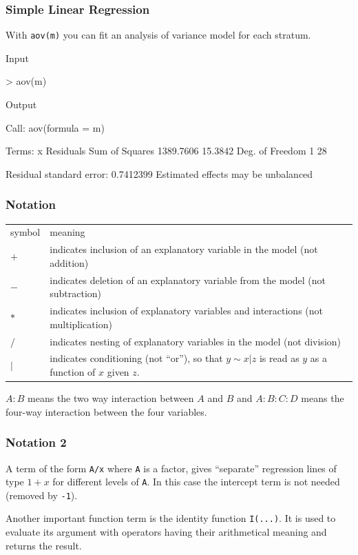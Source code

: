 \documentclass[xcolor={table},handout]{beamer}
\begin{document}
\begin{frame}[shrink=3,fragile]\frametitle{Simple Linear Regression}
With \texttt{aov(m)} you can fit an analysis of variance model for each stratum.
\begin{exampleblock}{Input}
\begin{semiverbatim}
> aov(m)
\end{semiverbatim}
\end{exampleblock}
\begin{exampleblock}{Output}\footnotesize
\begin{semiverbatim}
Call:
   aov(formula = m)

Terms:
                        x Residuals
Sum of Squares  1389.7606   15.3842
Deg. of Freedom         1        28

Residual standard error: 0.7412399 
Estimated effects may be unbalanced
\end{semiverbatim}
\end{exampleblock}
\end{frame}

\begin{frame}\frametitle{Notation}
\begin{center}
  \begin{tabular}{@{} >{\ttfamily}l p{9cm}} 
    \rowcolor{gray!40}
symbol & meaning\\
$+$ & indicates inclusion of an explanatory variable in the model (not addition)\\
$-$ & indicates deletion of an explanatory variable from the model (not subtraction)\\
$*$ & indicates inclusion of explanatory variables and interactions (not multiplication)\\
$/$ & indicates nesting of explanatory variables in the model (not division)\\
$|$ & indicates conditioning (not ``or''), so that $y \sim x | z $ is read as $y$ as a function of $x$ given $z$.\\
\end{tabular}
\end{center}
$A:B$ means the two way interaction between $A$ and $B$ and $A:B:C:D$ means the four-way interaction between the four variables.
\end{frame}

\begin{frame}\frametitle{Notation 2}
A term of the form \texttt{A/x} where \texttt{A} is a factor, gives ``separate'' regression lines of type $1+x$ for different levels of \texttt{A}. In this case the intercept term is not needed (removed by \texttt{-1}).

Another important function term is the identity function \texttt{I(...)}. It is used to evaluate its argument with operators having their arithmetical meaning and returns the result. 
\end{frame}
\end{document}
